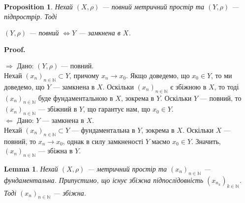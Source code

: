 \documentclass[a4paper, 10pt]{article}
\makeatletter
\def\rightproof{$\boxed{\Rightarrow}$ }
\def\leftproof{$\boxed{\Leftarrow}$ }
\theoremstyle{theoremdd}
\theoremstyle{theoremdd}
\theoremstyle{theoremdd}
\theoremstyle{theoremdd}
\theoremstyle{theoremdd}
\newtheorem{proposition}[theorem]{Proposition}
\theoremstyle{theoremdd}
\theoremstyle{theoremdd}
\newtheorem{lemma}[theorem]{Lemma}
\theoremstyle{theoremdd}
\renewenvironment{proof}[1][Proof.\\]{\par
\pushQED{\hfill \qed}%
\normalfont \topsep6\p@\@plus6\p@\relax
\trivlist
\item\relax
{\bfseries
#1\@addpunct{.}}\hspace\labelsep\ignorespaces
}{%
\popQED\endtrivlist\@endpefalse
}
\makeatother
\begin{document}
\begin{proposition}
Нехай $(X,\rho)$ --- повний метричний простір та $(Y,\rho)$ --- підпрострір. Тоді
\begin{center}
$(Y,\rho)$ --- повний $\iff Y$ --- замкнена в $X$.
\end{center}
\end{proposition}

\begin{proof}
\rightproof Дано: $(Y,\rho)$ --- повний.\\
Нехай $(x_n)_{n \in \mathbb{N}} \subset Y$, причому $x_n \to x_0$. Якщо доведемо, що $x_0 \in Y$, то ми доведемо, що $Y$ --- замкнена в $X$. Оскільки $(x_n)_{n \in \mathbb{N}}$ є збіжною в $X$, то тоді $(x_n)_{n \in \mathbb{N}}$ буде фундаментальною в $X$, зокрема в $Y$. Оскільки $Y$ --- повний, то $(x_n)_{n \in \mathbb{N}}$ --- збіжний в $Y$, що гарантує нам, що $x_0 \in Y$.
\bigskip \\
\leftproof Дано: $Y$ --- замкнена в $X$.\\
Нехай $(x_n)_{n \in \mathbb{N}} \subset Y$ --- фундаментальна в $Y$, зокрема в $X$. Оскільки $X$ --- повний, то $x_n \to x_0$, однак в силу замкненості $Y$ маємо $x_0 \in Y$. Значить, $(x_n)_{n \in \mathbb{N}}$ --- збіжна в $Y$.

\end{proof}

\begin{lemma}
\label{Cauchy_and_convergent_subsequence_implies_convergent_sequence}
Нехай $(X,\rho)$ --- метричний простір та $(x_n)_{n \in \mathbb{N}}$ --- фундаментальна. Припустимо, що існує збіжна підпослідовність $\left(x_{n_k}\right)_{k \in \mathbb{N}}$. Тоді $(x_n)_{n \in \mathbb{N}}$ --- збіжна.
\end{lemma}
\end{document}
